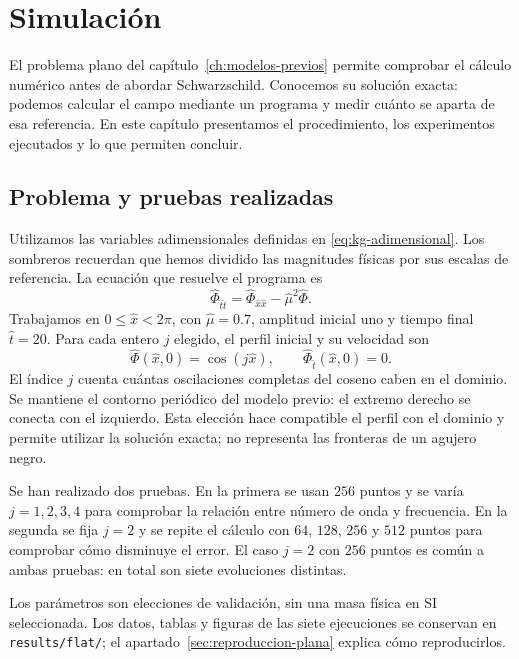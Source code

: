 \chapter{Simulación}
\label{ch:simulacion}

El problema plano del capítulo~\ref{ch:modelos-previos} permite comprobar
el cálculo numérico antes de abordar Schwarzschild. Conocemos su solución
exacta: podemos calcular el campo mediante un programa y medir cuánto se
aparta de esa referencia. En este capítulo presentamos el procedimiento,
los experimentos ejecutados y lo que permiten concluir.

\section{Problema y pruebas realizadas}

Utilizamos las variables adimensionales definidas en
\eqref{eq:kg-adimensional}. Los sombreros recuerdan que hemos dividido las
magnitudes físicas por sus escalas de referencia. La ecuación que resuelve
el programa es
\[
\widehat\Phi_{\widehat t\widehat t}
=\widehat\Phi_{\widehat x\widehat x}-\widehat\mu^2\widehat\Phi.
\]
Trabajamos en $0\le\widehat x<2\pi$, con $\widehat\mu=0.7$, amplitud
inicial uno y tiempo final $\widehat t=20$. Para cada entero $j$ elegido,
el perfil inicial y su velocidad son
\[
\widehat\Phi(\widehat x,0)=\cos(j\widehat x),\qquad
\widehat\Phi_{\widehat t}(\widehat x,0)=0.
\]
El índice $j$ cuenta cuántas oscilaciones completas del coseno caben en el
dominio. Se mantiene el contorno periódico del modelo previo: el extremo
derecho se conecta con el izquierdo. Esta elección hace compatible el
perfil con el dominio y permite utilizar la solución exacta; no representa
las fronteras de un agujero negro.

Se han realizado dos pruebas. En la primera se usan $256$ puntos y se
varía $j=1,2,3,4$ para comprobar la relación entre número de onda y
frecuencia. En la segunda se fija $j=2$ y se repite el cálculo con $64$,
$128$, $256$ y $512$ puntos para comprobar cómo disminuye el error.
El caso $j=2$ con $256$ puntos es común a ambas pruebas: en total son
siete evoluciones distintas.

Los parámetros son elecciones de validación, sin una masa física en SI
seleccionada. Los datos, tablas y figuras de las siete ejecuciones se
conservan en \texttt{results/flat/}; el apartado~\ref{sec:reproduccion-plana}
explica cómo reproducirlos.

\begin{table}[htbp]
\centering\small

\caption{Las siete ejecuciones distintas. El caso de 256 puntos con
$j=2$ participa en ambas comprobaciones. Todas usan los mismos datos
comunes descritos arriba.}
\label{tab:ejecuciones-planas}
\end{table}

